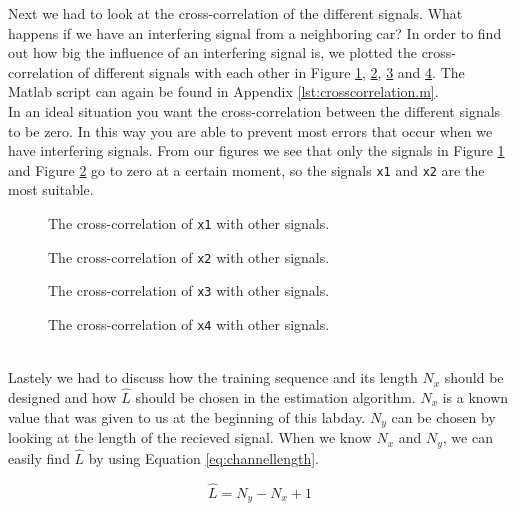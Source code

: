 \documentclass[final]{scrreprt} %
\begin{document}
Next we had to look at the cross-correlation of the different signals. 
What happens if we have an interfering signal from a neighboring car?
In order to find out how big the influence of an interfering signal is, we plotted the cross-correlation of different signals with each other in Figure \ref{fig:cross1}, \ref{fig:cross2}, \ref{fig:cross3} and \ref{fig:cross4}.
The Matlab script can again be found in Appendix \ref{lst:crosscorrelation.m}.
\\
In an ideal situation you want the cross-correlation between the different signals to be zero. 
In this way you are able to prevent most errors that occur when we have interfering signals. 
From our figures we see that only the signals in Figure \ref{fig:cross1} and Figure \ref{fig:cross2} go to zero at a certain moment, so the signals \texttt{x1} and \texttt{x2} are the most suitable.

\begin{figure}[H]
	\centering
    	\setlength\figureheight{6cm}
    	\setlength\figurewidth{10cm}
    	    	
    	\caption{The cross-correlation of \texttt{x1} with other signals.}
    	\label{fig:cross1}
\end{figure}

\begin{figure}[H]
	\centering
    	\setlength\figureheight{6cm}
    	\setlength\figurewidth{10cm}
    	    	
    	\caption{The cross-correlation of \texttt{x2} with other signals.}
    	\label{fig:cross2}
\end{figure}

\begin{figure}[H]
	\centering
    	\setlength\figureheight{6cm}
    	\setlength\figurewidth{10cm}
    	    	
    	\caption{The cross-correlation of \texttt{x3} with other signals.}
    	\label{fig:cross3}
\end{figure}

\begin{figure}[H]
	\centering
    	\setlength\figureheight{6cm}
    	\setlength\figurewidth{10cm}
    	    	
    	\caption{The cross-correlation of \texttt{x4} with other signals.}
    	\label{fig:cross4}
\end{figure}\\ 


Lastely we had to discuss how the training  sequence and its length $N_x$ should be designed and how $\hat{L}$ should be chosen in the estimation algorithm.
$N_x$ is a known value that was given to us at the beginning of this labday. 
$N_y$ can be chosen by looking at the length of the recieved signal.
When we know $N_x$ and $N_y$, we can easily find $\hat{L}$ by using Equation \ref{eq:channellength}.

\begin{equation}
\hat{L}=N_y - N_x +1
\label{eq:channellength}
\end{equation}
\end{document}
